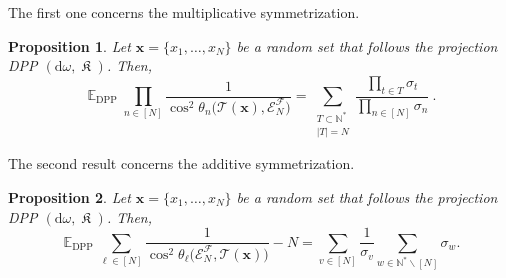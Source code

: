 \documentclass[twoside,11pt]{book}
\newtheorem{proposition}{Proposition}
\numberwithin{theorem}{chapter}
\numberwithin{definition}{chapter}
\numberwithin{proposition}{chapter}
\numberwithin{corollary}{chapter}
\numberwithin{example}{chapter}
\numberwithin{lemma}{chapter}
\DeclareMathOperator{\DPP}{\mathrm{DPP}}
\DeclareMathOperator{\EX}{\mathbb{E}}
\DeclareMathOperator*{\KDPP}{\mathfrak{K}}
\begin{document}
The first one concerns the multiplicative symmetrization.
\begin{proposition}\label{prop:expected_value_of_product_of_cos}
Let $\bm{x} = \{x_{1}, \dots , x_{N}\}$ be a random set that follows the projection DPP $(\mathrm{d}\omega, \KDPP )$. Then,
\begin{equation}\label{eq:expected_value_of_product_of_cos}
\EX_{\DPP} \prod\limits_{n \in [N]} \frac{1}{\cos^{2} \theta_{n}\bigg(\mathcal{T}(\bm{x}), \mathcal{E}^{\mathcal{F}}_{N} \bigg)}   = \sum\limits_{\substack{T \subset \mathbb{N}^{*} \\ |T| = N}} \frac{ \prod\limits_{t \in T}\sigma_{t}}{\prod\limits_{n \in [N]} \sigma_{n}} \:.
\end{equation}
\end{proposition}

The second result concerns the additive symmetrization.

\begin{proposition}\label{prop:ex_dpp_sum_inv_cos}
Let $\bm{x} = \{x_{1}, \dots , x_{N}\}$ be a random set that follows the projection DPP $(\mathrm{d}\omega, \KDPP )$. Then,
\begin{equation}
\EX_{\DPP}  \sum\limits_{\ell \in [N]} \frac{1}{\cos^{2} \theta_{\ell} \bigg(\mathcal{E}^{\mathcal{F}}_{N}, \mathcal{T}(\bm{x}) \bigg)} -N =  \sum\limits_{v \in [N]} \frac{1}{\sigma_{v}} \sum\limits_{w \in \mathbb{N}^{*}\smallsetminus [N]} \sigma_{w}.
\end{equation}
\end{proposition}



\end{document}
